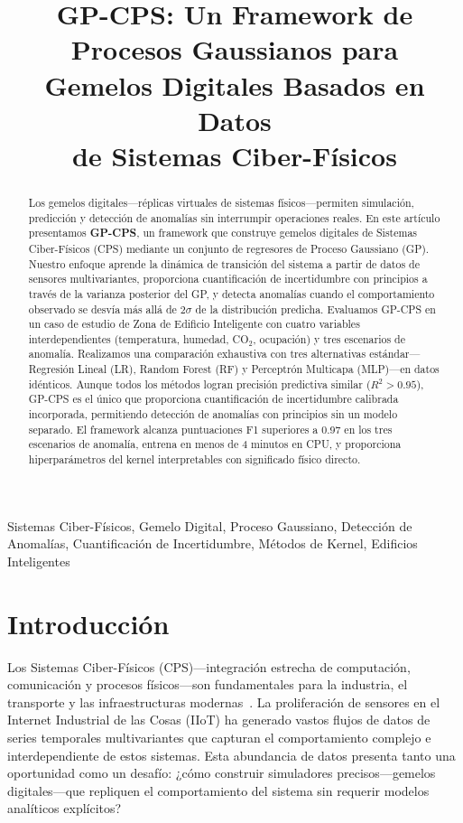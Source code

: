 \documentclass[conference]{IEEEtran}
\title{GP-CPS: Un Framework de Procesos Gaussianos para\\ Gemelos Digitales Basados en Datos\\ de Sistemas Ciber-Físicos}
\author{\IEEEauthorblockN{J. Calataiut-Cl\raisebox{0.5mm}{\noindent\rule{3mm}{0.5pt}}i\raisebox{0.5mm}{\noindent\rule{3mm}{0.5pt}}}
\IEEEauthorblockA{Departamento de Matemáticas Avanzadas\\
Universidad Politécnica\\
Email: jcalataiut-cli@github.com}
}
\begin{document}
\maketitle

\begin{abstract}
Los gemelos digitales---réplicas virtuales de sistemas físicos---permiten simulación, predicción y detección de anomalías sin interrumpir operaciones reales. En este artículo presentamos \textbf{GP-CPS}, un framework que construye gemelos digitales de Sistemas Ciber-Físicos (CPS) mediante un conjunto de regresores de Proceso Gaussiano (GP). Nuestro enfoque aprende la dinámica de transición del sistema a partir de datos de sensores multivariantes, proporciona cuantificación de incertidumbre con principios a través de la varianza posterior del GP, y detecta anomalías cuando el comportamiento observado se desvía más allá de $2\sigma$ de la distribución predicha. Evaluamos GP-CPS en un caso de estudio de Zona de Edificio Inteligente con cuatro variables interdependientes (temperatura, humedad, CO$_2$, ocupación) y tres escenarios de anomalía. Realizamos una comparación exhaustiva con tres alternativas estándar---Regresión Lineal (LR), Random Forest (RF) y Perceptrón Multicapa (MLP)---en datos idénticos. Aunque todos los métodos logran precisión predictiva similar ($R^2 > 0.95$), GP-CPS es el \'unico que proporciona cuantificación de incertidumbre calibrada incorporada, permitiendo detección de anomalías con principios sin un modelo separado. El framework alcanza puntuaciones F1 superiores a 0.97 en los tres escenarios de anomalía, entrena en menos de 4 minutos en CPU, y proporciona hiperparámetros del kernel interpretables con significado físico directo.
\end{abstract}

\begin{IEEEkeywords}
Sistemas Ciber-Físicos, Gemelo Digital, Proceso Gaussiano, Detección de Anomalías, Cuantificación de Incertidumbre, Métodos de Kernel, Edificios Inteligentes
\end{IEEEkeywords}

\section{Introducción}
\label{sec:introduccion}

Los Sistemas Ciber-Físicos (CPS)---integración estrecha de computación, comunicación y procesos físicos---son fundamentales para la industria, el transporte y las infraestructuras modernas~\cite{lee2015,zhang2022}. La proliferación de sensores en el Internet Industrial de las Cosas (IIoT) ha generado vastos flujos de datos de series temporales multivariantes que capturan el comportamiento complejo e interdependiente de estos sistemas. Esta abundancia de datos presenta tanto una oportunidad como un desafío: ¿cómo construir simuladores precisos---gemelos digitales---que repliquen el comportamiento del sistema sin requerir modelos analíticos explícitos?
\end{document}
